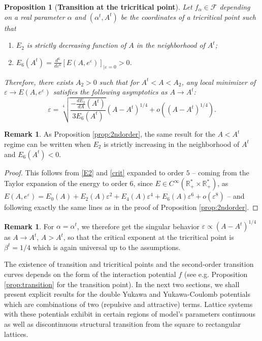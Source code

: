 \documentclass[12pt]{interact}
\newtheorem{prop}[thm]{Proposition}
\theoremstyle{definition}
\newtheorem{remark}[thm]{Remark}
\newcommand{\R}{\mathbb R}
\begin{document}
\begin{prop}[\textbf{Transition at the tricritical point}]
Let $f_\alpha\in \mathcal{F}$ depending on a real parameter $\alpha$ and $(\alpha^t,A^t)$ be the coordinates of
a tricritical point such that
\begin{enumerate}
\item $E_2$ is strictly decreasing function of $A$ in the neighborhood of $A^t$;
\item $E_6(A^t)=\frac{d^6}{d\varepsilon^6}
\left[E(A,e^\varepsilon)\right]_{|\varepsilon=0}>0$.
\end{enumerate}
Therefore, there exists $A_2>0$ such that for $A^t<A<A_2$, any local minimizer of
$\varepsilon\to E(A,e^\varepsilon)$ satisfies the following asymptotics as
$A\to A^t$:
$$
\varepsilon = \sqrt[4]{\frac{-\frac{d E_2}{dA}(A^t)}{3 E_6(A^t)}}
(A-A^t)^{1/4}+o\left((A-A^t)^{1/4} \right).
$$
\end{prop}
\begin{remark}
As Proposition \ref{prop:2ndorder}, the same result for the $A<A^t$ regime
can be written when $E_2$ is strictly increasing in the neighborhood of $A^t$
and $E_6(A^t)<0$.
\end{remark} 
\begin{proof}
This follows from \eqref{E2} and \eqref{crit} expanded to order $5$ --
coming from the Taylor expansion of the energy to order $6$, since $E\in C^\infty(\R_+^*\times \R_+^*)$, as
$E(A,e^\varepsilon)=E_0(A)+E_2(A)\varepsilon^2+E_4(A)\varepsilon^4
+E_6(A)\varepsilon^6+o(\varepsilon^8)$ -- and following
exactly the same lines as in the proof of
Proposition \ref{prop:2ndorder}.
\end{proof}
\begin{remark}
For $\alpha=\alpha^t$, we therefore get the singular
behavior $\varepsilon\propto (A-A^t)^{1/4}$ as $A\to A^t$, $A>A^t$, so that
the critical exponent at the tricritical point is $\beta^t=1/4$ which
is again universal up to the assumptions.
\end{remark}

The existence of transition and tricritical points and the second-order
transition curves depends on the form of the interaction potential $f$
(see e.g. Proposition \ref{prop:transition} for the transition point).
In the next two sections, we shall present explicit results for
the double Yukawa and Yukawa-Coulomb potentials which are combinations of two
(repulsive and attractive) terms.
Lattice systems with these potentials exhibit in certain regions
of model's parameters continuous as well as discontinuous
structural transition from the square to rectangular lattices.
\end{document}
